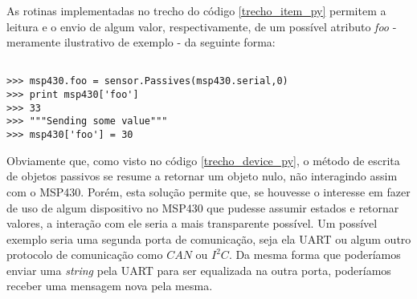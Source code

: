 As rotinas implementadas no trecho do código \ref{trecho_item_py} permitem a leitura e o envio de algum valor, respectivamente, de um possível atributo \textit{foo} - meramente ilustrativo de exemplo - da seguinte forma:

\begin{lstlisting}[frame=none,numbers=none]  % Start your code-block

>>> msp430.foo = sensor.Passives(msp430.serial,0)
>>> print msp430['foo']
>>> 33
>>> """Sending some value"""
>>> msp430['foo'] = 30
\end{lstlisting}

	Obviamente que, como visto no código \ref{trecho_device_py}, o método de escrita de objetos passivos se resume a retornar um objeto nulo, não interagindo assim com o MSP430. Porém, esta solução permite que, se houvesse o interesse em fazer de uso de algum dispositivo no MSP430 que pudesse assumir estados e retornar valores, a interação com ele seria a mais transparente possível. Um possível exemplo seria uma segunda porta de comunicação, seja ela UART ou algum outro protocolo de comunicação como $CAN$ ou $I^2C$. Da mesma forma que poderíamos enviar uma \textit{string} pela UART para ser equalizada na outra porta, poderíamos receber uma mensagem nova pela mesma.

